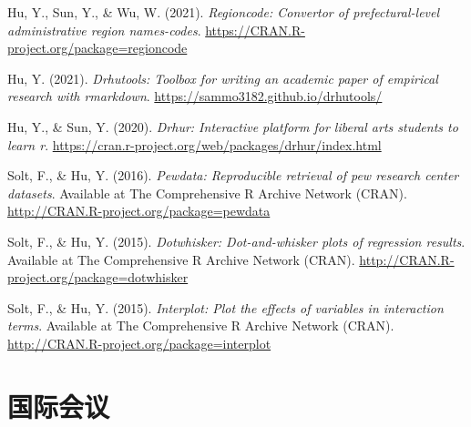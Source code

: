\documentclass[
  12pt,
]
{article}
\newlength{\cslhangindent}
\newlength{\cslentryspacingunit} %
\newenvironment{CSLReferences}[2] %
 {%
  \setlength{\parindent}{0pt}
  \ifodd #1
  \let\oldpar\par
  \def\par{\hangindent=\cslhangindent\oldpar}
  \fi
  \setlength{\parskip}{#2\cslentryspacingunit}
 }%
 {}
\begin{document}
\hypertarget{refs-software}{}
\begin{CSLReferences}{1}{0}
\leavevmode{}%
Hu, Y., Sun, Y., \& Wu, W. (2021). \emph{Regioncode: Convertor of
prefectural-level administrative region names-codes}.
\url{https://CRAN.R-project.org/package=regioncode}

\leavevmode{}%
Hu, Y. (2021). \emph{Drhutools: Toolbox for writing an academic paper of
empirical research with rmarkdown}.
\url{https://sammo3182.github.io/drhutools/}

\leavevmode{}%
Hu, Y., \& Sun, Y. (2020). \emph{Drhur: Interactive platform for liberal
arts students to learn r}.
\url{https://cran.r-project.org/web/packages/drhur/index.html}

\leavevmode{}%
Solt, F., \& Hu, Y. (2016). \emph{Pewdata: Reproducible retrieval of pew
research center datasets}. Available at The Comprehensive R Archive
Network (CRAN). \url{http://CRAN.R-project.org/package=pewdata}

\leavevmode{}%
Solt, F., \& Hu, Y. (2015). \emph{Dotwhisker: Dot-and-whisker plots of
regression results}. Available at The Comprehensive R Archive Network
(CRAN). \url{http://CRAN.R-project.org/package=dotwhisker}

\leavevmode{}%
Solt, F., \& Hu, Y. (2015). \emph{Interplot: Plot the effects of
variables in interaction terms}. Available at The Comprehensive R
Archive Network (CRAN).
\url{http://CRAN.R-project.org/package=interplot}

\end{CSLReferences}

\hypertarget{ux56fdux9645ux4f1aux8bae}{%
\section{国际会议}\label{ux56fdux9645ux4f1aux8bae}}
\end{document}
